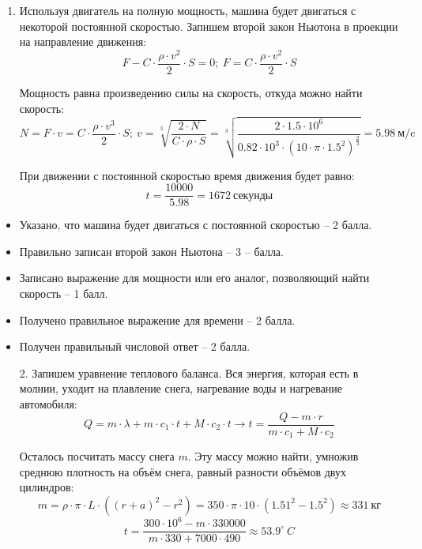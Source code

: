 \solutionSection

\begin{enumerate}
    \item Используя двигатель на полную мощность, машина будет двигаться с некоторой постоянной скоростью. Запишем второй закон Ньютона в проекции на направление движения: 
    $$F- C \cdot \frac{\rho \cdot v^2}{2} \cdot S=0; \:  F= C \cdot \frac{\rho \cdot v^2}{2} \cdot S$$ 
    
    Мощность равна произведению силы на скорость, откуда можно найти скорость:
    $$N=F \cdot v=C \cdot \frac{\rho \cdot v^3}{2} \cdot S; \: v= \sqrt[3]{\frac{2 \cdot N}{C \cdot \rho \cdot S}}=\sqrt[3]{\frac{2 \cdot 1.5 \cdot 10^6}{0.82 \cdot 10^3 \cdot (10 \cdot \pi \cdot 1.5^2 )^{\frac{2}{3}}}}= 5.98 \: \text{м/c}$$
    
    При движении с постоянной скоростью время движения будет равно:
    $$t=\frac{10000}{5.98}=1672 \: \text{секунды}$$
    
\end{enumerate}

\additionalCriteria
    \begin{itemize}
        \item Указано, что машина будет двигаться с постоянной скоростью – 2 балла.
        \item Правильно записан второй закон Ньютона – 3 – балла.
        \item Записано выражение для мощности или его аналог, позволяющий найти скорость – 1 балл.
        \item Получено правильное выражение для времени – 2 балла.
        \item Получен правильный числовой ответ – 2 балла.
    \end{itemize}

    \begin{enumerate}
    \item[2.] Запишем уравнение теплового баланса. Вся энергия, 
    которая есть в молнии, уходит на плавление снега, 
    нагревание воды и нагревание автомобиля:
    $$Q=m \cdot \lambda +m \cdot c_1 \cdot t+M \cdot c_2 \cdot t \rightarrow t=  \frac{Q-m \cdot r}{m \cdot c_1+M \cdot c_2}$$

    Осталось посчитать массу снега $m$. Эту массу можно найти, умножив среднюю плотность на объём снега, равный 
    разности объёмов двух цилиндров:
    $$m=\rho \cdot \pi \cdot L \cdot ((r+a)^2-r^2 )=350 \cdot \pi \cdot 10 \cdot (1.51^2-1.5^2 ) \approx 331 \: \text{кг}$$
    $$t= \frac{300 \cdot 10^6-m \cdot 330000}{m \cdot 330+7000 \cdot 490} \approx 53.9^\circ \: C$$

\end{enumerate}  

